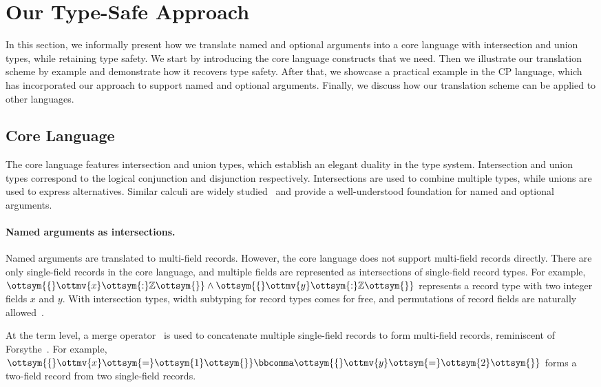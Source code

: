 \section{Our Type-Safe Approach} \label{sec:type-safe}

In this section, we informally present how we translate named and optional
arguments into a core language with intersection and union types, while
retaining type safety. We start by introducing the core language constructs that
we need. Then we illustrate our translation scheme by example and demonstrate
how it recovers type safety. After that, we showcase a practical example in the
CP language, which has incorporated our approach to support named and optional
arguments. Finally, we discuss how our translation scheme can be applied to
other languages.

\subsection{Core Language} \label{sec:core}

The core language features intersection and union types, which establish an
elegant duality in the type system. Intersection and union types correspond to
the logical conjunction and disjunction respectively. Intersections are used to
combine multiple types, while unions are used to express alternatives. Similar
calculi are widely
studied~\citep{barbanera1995intersection,frisch2008semantic,dunfield2014elaborating}
and provide a well-understood foundation for named and optional arguments.

\paragraph{Named arguments as intersections.}
Named arguments are translated to multi-field records. However, the core
language does not support multi-field records directly. There are only
single-field records in the core language, and multiple fields are represented
as intersections of single-field record types. For example,
$\ottsym{\{}  \ottmv{x}  \ottsym{:}   \mathbb{Z}   \ottsym{\}}  \land  \ottsym{\{}  \ottmv{y}  \ottsym{:}   \mathbb{Z}   \ottsym{\}}$ represents a record type with two integer fields $x$ and
$y$. With intersection types, width subtyping for record types comes for free,
and permutations of record fields are naturally
allowed~\citep{reynolds1997design}.

At the term level, a merge
operator~\citep{dunfield2014elaborating,rehman2023blend} is used to concatenate
multiple single-field records to form multi-field records, reminiscent of
Forsythe~\citep{reynolds1997design}. For example, $\ottsym{\{}  \ottmv{x}  \ottsym{=}  \ottsym{1}  \ottsym{\}}  \bbcomma  \ottsym{\{}  \ottmv{y}  \ottsym{=}  \ottsym{2}  \ottsym{\}}$ forms a
two-field record from two single-field records.

